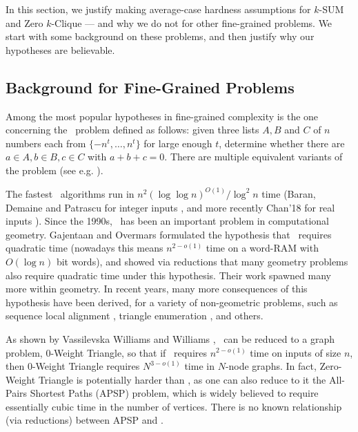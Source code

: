 In this section, we justify making average-case hardness assumptions for $k$-SUM and Zero $k$-Clique --- and why we do not for other fine-grained problems. We start with some background on these problems, and then justify why our hypotheses are believable.

\subsection{Background for Fine-Grained Problems}
Among the most popular hypotheses in fine-grained complexity is the one concerning the \ThSum~problem defined as follows: given three lists $A,B$ and $C$ of $n$ numbers each from $\{-n^t,\ldots,n^t\}$ for large enough $t$, determine whether there are $a\in A, b\in B, c\in C$ with $a+b+c=0$. There are multiple equivalent variants of the problem (see e.g. \cite{3sumIntroduction}).%

The fastest \ThSum~algorithms run in $n^2(\log\log n)^{O(1)}/\log^2 n$ time (Baran, Demaine and Patrascu for integer inputs \cite{BaranDP08}, and more recently Chan'18 for real inputs \cite{Chan18}). Since the 1990s, \ThSum~has been an important problem in computational geometry. Gajentaan and Overmars \cite{3sumIntroduction} formulated the hypothesis that \ThSum~requires quadratic time (nowadays this means
$n^{2-o(1)}$ time on a word-RAM with $O(\log n)$ bit words), and showed via reductions that many geometry problems also require quadratic time under this hypothesis. Their work spawned many more within geometry. In recent years, many more consequences of this hypothesis have been derived, for a variety of non-geometric problems, such as sequence local alignment \cite{abboud2014consequences}, triangle enumeration \cite{Patrascu10,KopelowitzPP16}, and others.

As shown by Vassilevska Williams and Williams \cite{virgi10}, \ThSum~can be reduced to a graph problem, 0-Weight Triangle, so that if \ThSum~requires $n^{2-o(1)}$ time on inputs of size $n$, then 0-Weight Triangle requires $N^{3-o(1)}$ time in $N$-node graphs. In fact, Zero-Weight Triangle is potentially harder than \ThSum, as one can also reduce to it the All-Pairs Shortest Paths (APSP) problem, which is widely believed to require essentially cubic time in the number of vertices. There is no known relationship (via reductions) between APSP and \ThSum.

